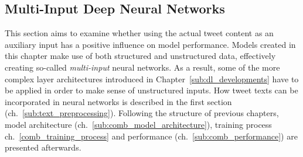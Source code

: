 \subsection{Multi-Input Deep Neural Networks}
\label{sec:deep_combined}

This section aims to examine whether using the actual tweet content as an
auxiliary input has a positive influence on model performance.
Models created in this chapter make use of both structured and unstructured data,
effectively creating so-called \textit{multi-input} neural networks.
As a result, some of the more complex layer architectures introduced in Chapter~\ref{sub:dl_developments}
have to be applied in order to make sense of unstructured inputs.
How tweet texts can be incorporated in neural networks is described in the
first section (ch.~\ref{sub:text_preprocessing}).
Following the structure of previous chapters, model architecture (ch.~\ref{sub:comb_model_architecture}),
training process {ch.~\ref{comb_training_process}} and performance (ch.~\ref{sub:comb_performance})
are presented afterwards.








